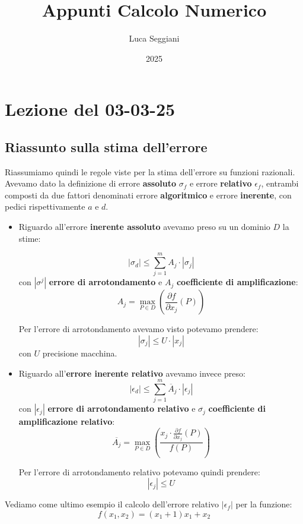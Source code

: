\documentclass[a4paper,11pt]{article}
\title{Appunti Calcolo Numerico}
\author{Luca Seggiani}
\date{2025}
\begin{document}
\section{Lezione del 03-03-25}

\thispagestyle{empty}
\pagestyle{fancy}

\subsection{Riassunto sulla stima dell'errore}
Riassumiamo quindi le regole viste per la stima dell'errore su funzioni razionali.
Avevamo dato la definizione di errore \textbf{assoluto} $\sigma_f$ e errore \textbf{relativo} $\epsilon_f$, entrambi composti da due fattori denominati errore \textbf{algoritmico} e errore \textbf{inerente}, con pedici rispettivamente $a$ e $d$.

\begin{itemize}
	\item 
Riguardo all'errore \textbf{inerente assoluto} avevamo preso su un dominio $D$ la stime:

$$
|\sigma_d| \leq \sum_{j = 1}^m A_j \cdot |\sigma_j|
$$
con $|\sigma^j|$ \textbf{errore di arrotondamento} e $A_j$ \textbf{coefficiente di amplificazione}:
$$
A_j = \max_{P \in D} \left( \frac{\partial f}{\partial x_j}(P) \right)
$$

Per l'errore di arrotondamento avevamo visto potevamo prendere:
$$
|\sigma_j| \leq U \cdot |x_j|
$$
con $U$ precisione macchina.

	\item
Riguardo all'\textbf{errore inerente relativo} avevamo invece preso:
$$
|\epsilon_d|\leq \sum_{j = 1}^m \overline{A}_j \cdot |\epsilon_j|
$$
con
$|\epsilon_j|$ \textbf{errore di arrotondamento relativo} e $\overline{\sigma_j}$ \textbf{coefficiente di amplificazione relativo}:
$$
\overline{A_j} = \max_{P \in D} \left( \frac{x_j \cdot \frac{\partial f}{\partial x_j} (P) }{f(P)} \right)
$$

Per l'errore di arrotondamento relativo potevamo quindi prendere:
$$
|\epsilon_j| \leq U
$$
\end{itemize}

\par\smallskip 

Vediamo come ultimo esempio il calcolo dell'errore relativo $|\epsilon_f|$ per la funzione:
$$
f(x_1, x_2) = (x_1 + 1) x_1 + x_2
$$
\end{document}
